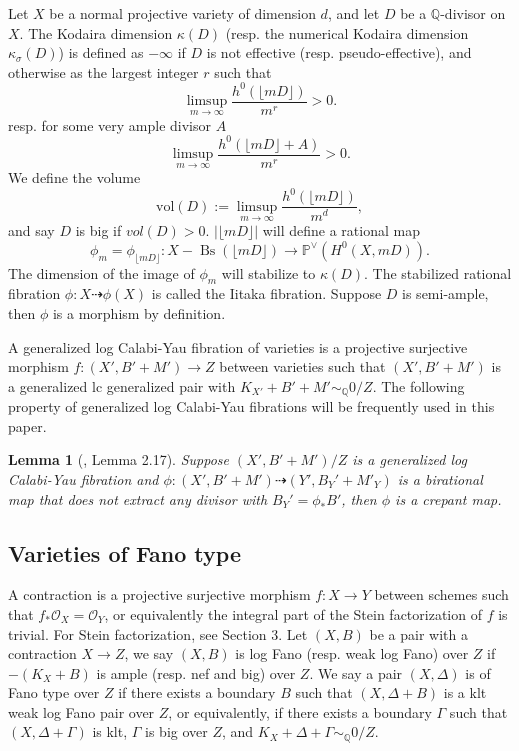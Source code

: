 \documentclass[letterpaper,reqno,12pt]{amsart}
\DeclareMathOperator{\Bs}{Bs}
\numberwithin{equation}{section}
\theoremstyle{plain}
\newtheorem{lemma}[theorem]{Lemma}
\begin{document}
Let $X$ be a normal projective variety of dimension $d$, and let $D$ be a $\mathbb Q$-divisor on $X$. The Kodaira dimension $\kappa(D)$ (resp. the numerical Kodaira dimension $\kappa_\sigma(D)$) is defined as $-\infty$ if $D$ is not effective (resp. pseudo-effective), and otherwise as the largest integer $r$ such that \[\limsup_{m\to\infty}\frac{h^0(\lfloor mD\rfloor)}{m^r}>0.\] resp. for some very ample divisor $A$\[\limsup_{m\to\infty}\frac{h^0(\lfloor mD\rfloor+A)}{m^r}>0.\] We define the volume \[\text{vol}(D):=\limsup_{m\to \infty}\frac{h^0(\lfloor mD\rfloor)}{m^d},\] and say $D$ is big if $vol(D)>0$. $|\lfloor mD\rfloor|$ will define a rational map \[\phi_m=\phi_{\lfloor mD\rfloor}:X-\Bs(\lfloor mD\rfloor)\to \mathbb P^\vee(H^0(X,mD)).\] The dimension of the image of $\phi_m$ will stabilize to $\kappa(D)$. The stabilized rational fibration $\phi:X\dashrightarrow \phi(X)$ is called the Iitaka fibration. Suppose $D$ is semi-ample, then $\phi$ is a morphism by definition.

A generalized log Calabi-Yau fibration of varieties is a projective surjective morphism $f:(X',B'+M')\to Z$ between varieties such that $(X',B'+M')$ is a generalized lc generalized pair with $K_{X'}+B'+M'\sim_\mathbb Q0/Z$. The following property of generalized log Calabi-Yau fibrations will be frequently used in this paper.

\begin{lemma}[\cite{sdeglogcalabiyau}, Lemma 2.17]\label{cycrep}
    Suppose $(X',B'+M')/Z$ is a generalized log Calabi-Yau fibration and $\phi:(X',B'+M')\dashrightarrow(Y',B_Y'+M'_Y)$ is a birational map that does not extract any divisor with $B_Y'=\phi_*B'$, then $\phi$ is a crepant map.
\end{lemma}

\subsection{Varieties of Fano type}
A contraction is a projective surjective morphism $f:X\to Y$ between schemes such that $f_*\mathcal O_X=\mathcal O_Y$, or equivalently the integral part of the Stein factorization of $f$ is trivial. For Stein factorization, see Section 3. Let $(X,B)$ be a pair with a contraction $X\to Z$, we say $(X,B)$ is log Fano (resp. weak log Fano) over $Z$ if $-(K_X+B)$ is ample (resp. nef and big) over $Z$. We say a pair $(X,\Delta)$ is of Fano type over $Z$ if there exists a boundary $B$ such that $(X,\Delta+B)$ is a klt weak log Fano pair over $Z$, or equivalently, if there exists a boundary $\Gamma$ such that $(X,\Delta+\Gamma)$ is klt, $\Gamma$ is big over $Z$, and $K_{X}+\Delta+\Gamma\sim_{\mathbb{Q}}0/Z$.
\end{document}
